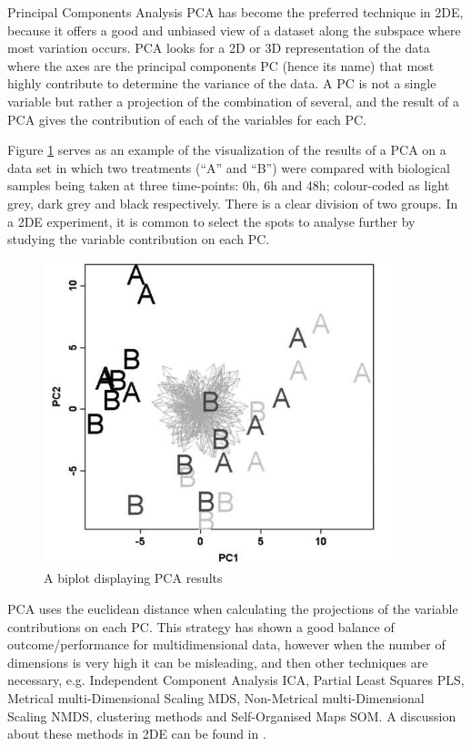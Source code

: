 Principal Components Analysis PCA has become the preferred technique in 2DE, because it offers a good and unbiased view of a dataset along the subspace where most variation occurs. PCA looks for a 2D or 3D representation of the data where the axes are the principal components PC (hence its name) that most highly contribute to determine the variance of the data. A PC is not a single variable but rather a projection of the combination of several, and the result of a PCA gives the contribution of each of the variables for each PC.

Figure \ref{fig:PCA} serves as an example of the visualization of the results of a PCA on a data set in which two treatments (``A'' and ``B'') were compared with biological samples being taken at three time-points: 0h, 6h and 48h; colour-coded as light grey, dark grey and black respectively. There is a clear division of two groups. In a 2DE experiment, it is common to select the spots to analyse further by studying the variable contribution on each PC.

\begin{figure}  
\centering
\includegraphics[width=4in]{figures/PCA.png}
\caption[Example of a PCA result plot.]{A biplot displaying PCA results 
\label{fig:PCA}}
\end{figure}

PCA uses the euclidean distance when calculating the projections of the variable contributions on each PC. This strategy has shown a good balance of outcome/performance for multidimensional data, however when the number of dimensions is very high it can be misleading, and then other techniques are necessary, e.g. Independent Component Analysis ICA, Partial Least Squares PLS, Metrical multi-Dimensional Scaling MDS, Non-Metrical multi-Dimensional Scaling NMDS, clustering methods and Self-Organised Maps SOM. A discussion about these methods in 2DE can be found in \cite{SIL2014}.



